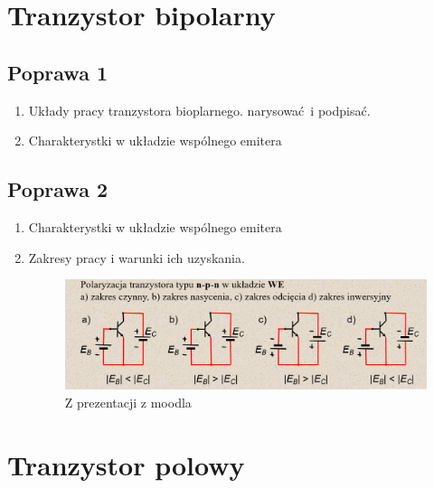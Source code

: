 \documentclass[11pt]{article}
\author{nil}
\date{\today}
\title{}
\begin{document}
\tableofcontents

\newpage
\section{Tranzystor bipolarny}
\label{sec:orga3c79a4}
\subsection{Poprawa 1}
\label{sec:orgd7401cd}
\begin{enumerate}
\item Układy pracy tranzystora bioplarnego. narysować i podpisać.
\label{sec:org7709c0c}
\item Charakterystki w układzie wspólnego emitera
\label{sec:org87b68d1}
\end{enumerate}
\subsection{Poprawa 2}
\label{sec:org1d156fc}
\begin{enumerate}
\item Charakterystki w układzie wspólnego emitera
\label{sec:orgb0bc1bb}
\item Zakresy pracy i warunki ich uzyskania.
\label{sec:org2bfbf43}
\begin{figure}[htbp]
\centering
\includegraphics[width=.9\linewidth]{img/tranzystorBipolarny/zakresy.png}
\caption{Z prezentacji z moodla}
\end{figure}
\newpage
\end{enumerate}
\section{Tranzystor polowy}
\label{sec:org73b6eac}
\end{document}
